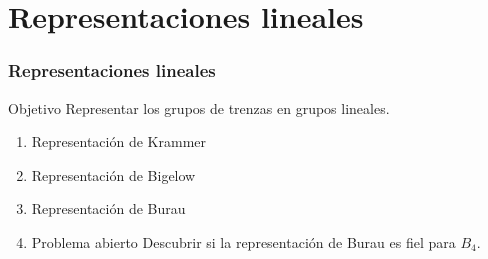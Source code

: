 \documentclass{beamer}
\theoremstyle{definition}
\begin{document}
\section{Representaciones lineales}

\begin{frame}
\frametitle{Representaciones lineales}
\begin{block}{Objetivo}
Representar los grupos de trenzas en grupos lineales. 
\end{block}
\begin{enumerate}
\item<2-> Representación de Krammer
\item<3-> Representación de Bigelow
\item<4-> Representación de Burau
\item<5->[] \begin{alertblock}{Problema abierto}
Descubrir si la representación de Burau es fiel para $B_4$. 
\end{alertblock}
\end{enumerate}


\end{frame}
\end{document}
